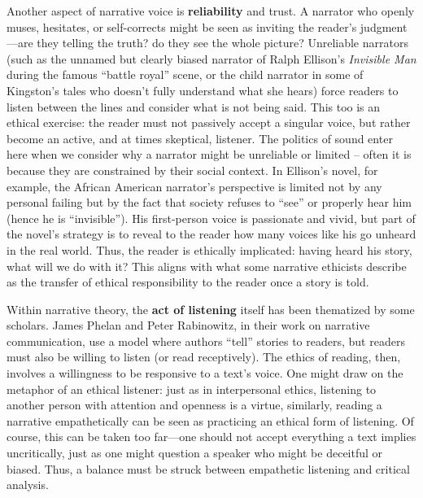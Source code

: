\documentclass[12pt]{report}
\begin{document}
Another aspect of narrative voice is \textbf{reliability} and trust. A narrator who openly muses, hesitates, or self-corrects might be seen as inviting the reader’s judgment—are they telling the truth? do they see the whole picture? Unreliable narrators (such as the unnamed but clearly biased narrator of Ralph Ellison’s \textit{Invisible Man} during the famous “battle royal” scene, or the child narrator in some of Kingston’s tales who doesn’t fully understand what she hears) force readers to listen between the lines and consider what is not being said. This too is an ethical exercise: the reader must not passively accept a singular voice, but rather become an active, and at times skeptical, listener. The politics of sound enter here when we consider why a narrator might be unreliable or limited – often it is because they are constrained by their social context. In Ellison’s novel, for example, the African American narrator’s perspective is limited not by any personal failing but by the fact that society refuses to “see” or properly hear him (hence he is “invisible”). His first-person voice is passionate and vivid, but part of the novel’s strategy is to reveal to the reader how many voices like his go unheard in the real world. Thus, the reader is ethically implicated: having heard his story, what will we do with it? This aligns with what some narrative ethicists describe as the transfer of ethical responsibility to the reader once a story is told.

Within narrative theory, the \textbf{act of listening} itself has been thematized by some scholars. James Phelan and Peter Rabinowitz, in their work on narrative communication, use a model where authors “tell” stories to readers, but readers must also be willing to listen (or read receptively). The ethics of reading, then, involves a willingness to be responsive to a text’s voice. One might draw on the metaphor of an ethical listener: just as in interpersonal ethics, listening to another person with attention and openness is a virtue, similarly, reading a narrative empathetically can be seen as practicing an ethical form of listening. Of course, this can be taken too far—one should not accept everything a text implies uncritically, just as one might question a speaker who might be deceitful or biased. Thus, a balance must be struck between empathetic listening and critical analysis.
\end{document}
